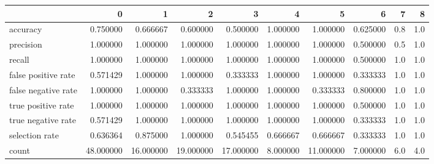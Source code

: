 \begin{tabular}{lrrrrrrrrr}
\toprule
{} &          0 &          1 &          2 &          3 &         4 &          5 &         6 &    7 &    8 \\
\midrule
accuracy            &   0.750000 &   0.666667 &   0.600000 &   0.500000 &  1.000000 &   1.000000 &  0.625000 &  0.8 &  1.0 \\
precision           &   1.000000 &   1.000000 &   1.000000 &   1.000000 &  1.000000 &   1.000000 &  0.500000 &  0.5 &  1.0 \\
recall              &   1.000000 &   1.000000 &   1.000000 &   1.000000 &  1.000000 &   1.000000 &  0.500000 &  1.0 &  1.0 \\
false positive rate &   0.571429 &   1.000000 &   1.000000 &   0.333333 &  1.000000 &   1.000000 &  0.333333 &  1.0 &  1.0 \\
false negative rate &   1.000000 &   1.000000 &   0.333333 &   1.000000 &  1.000000 &   0.333333 &  0.800000 &  1.0 &  1.0 \\
true positive rate  &   1.000000 &   1.000000 &   1.000000 &   1.000000 &  1.000000 &   1.000000 &  0.500000 &  1.0 &  1.0 \\
true negative rate  &   0.571429 &   1.000000 &   1.000000 &   1.000000 &  1.000000 &   1.000000 &  0.333333 &  1.0 &  1.0 \\
selection rate      &   0.636364 &   0.875000 &   1.000000 &   0.545455 &  0.666667 &   0.666667 &  0.333333 &  1.0 &  1.0 \\
count               &  48.000000 &  16.000000 &  19.000000 &  17.000000 &  8.000000 &  11.000000 &  7.000000 &  6.0 &  4.0 \\
\bottomrule
\end{tabular}
